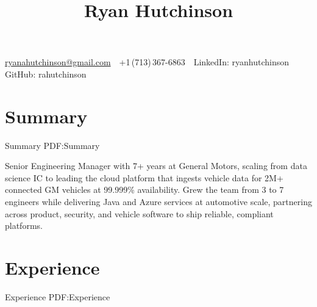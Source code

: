 \documentclass[a4paper,10pt,oneside]{article}
\begin{document}

\title{Ryan Hutchinson}

\begin{subtitle}

\par
\href{mailto:ryanahutchinson@gmail.com}
{ryanahutchinson@gmail.com}
\,\BulletSymbol\,
+1\,(713)\,367-6863
\,\BulletSymbol\,
LinkedIn: ryanhutchinson
\BulletSymbol\,
GitHub: rahutchinson
\end{subtitle}

\begin{body}


\section
{Summary}
{Summary}
{PDF:Summary}

Senior Engineering Manager with 7+ years at General Motors, scaling from data science IC to leading the cloud platform that ingests vehicle data for 2M+ connected GM vehicles at 99.999\% availability. Grew the team from 3 to 7 engineers while delivering Java and Azure services at automotive scale, partnering across product, security, and vehicle software to ship reliable, compliant platforms.


\section
{Experience}
{Experience}
{PDF:Experience}


\end{body}
\end{document}
